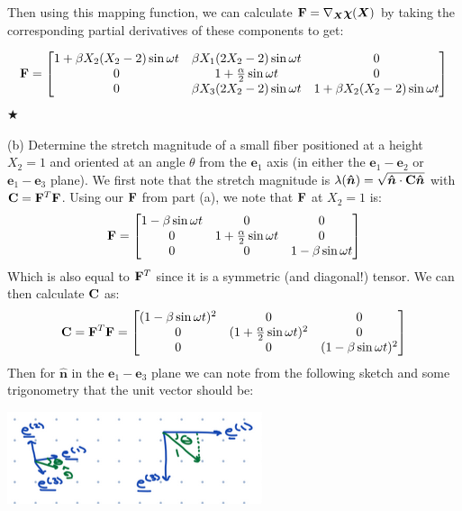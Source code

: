 Then using this mapping function, we can calculate $\mathbf{F} = \nabla_{\bm{X}} \space \bm{\chi}(\bm{X})$ by taking the corresponding partial derivatives of these components to get:

\begin{equation}
\mathbf{F} = 
\begin{bmatrix}
    1 + \beta X_2(X_2-2)\sin{\omega t} & \beta X_1 (2X_2-2)\sin{\omega t} & 0 \\
    0 & 1 + \frac{\alpha}{2}\sin{\omega t} & 0\\
    0 & \beta X_3 (2X_2-2)\sin{\omega t} & 1 + \beta X_2(X_2-2)\sin{\omega t}
\end{bmatrix}
\end{equation}
\hspace*{\fill} $\bigstar$

\medskip
(b) Determine the stretch magnitude of a small fiber positioned at a height $X_2 = 1$ and oriented at an angle $\theta$ from the $\bm{e}_1$ axis (in either the $\bm{e}_1- \bm{e}_2$ or $\bm{e}_1- \bm{e}_3$ plane). \newline
We first note that the stretch magnitude is $ \lambda (\bm{\hat{n}}) = \sqrt{\bm{\hat{n}} \cdot \mathbf{C} \bm{\hat{n}}}$ with $\mathbf{C} = \mathbf{F}^T\mathbf{F}$. Using our $\mathbf{F}$ from part (a), we note that $\mathbf{F}$ at $X_2 = 1$ is:
\begin{equation}
\mathbf{F} = 
\begin{bmatrix}
    1 - \beta \sin{\omega t} & 0 & 0 \\
    0 & 1 + \frac{\alpha}{2}\sin{\omega t} & 0\\
    0 & 0 & 1 - \beta \sin{\omega t}
\end{bmatrix}
\end{equation}
Which is also equal to $\mathbf{F}^T$ since it is a symmetric (and diagonal!) tensor. We can then calculate $\mathbf{C}$ as:
\begin{equation}
\mathbf{C} = \mathbf{F}^T\mathbf{F} = 
\begin{bmatrix}
    (1 - \beta \sin{\omega t})^2 & 0 & 0 \\
    0 & (1 + \frac{\alpha}{2}\sin{\omega t})^2 & 0\\
    0 & 0 & (1 - \beta \sin{\omega t})^2
\end{bmatrix}
\end{equation}
Then for $\bm{\hat{n}}$ in the $\bm{e}_1- \bm{e}_3$ plane we can note from the following sketch and some trigonometry that the unit vector should be:

\includegraphics{Dawson-figures/BASIS.png}

